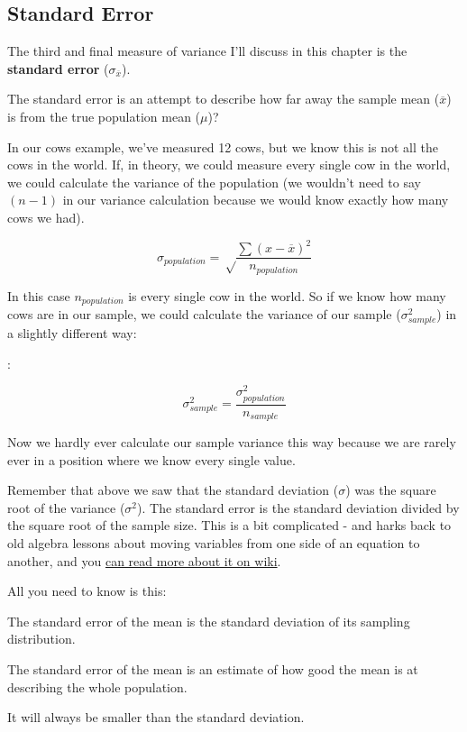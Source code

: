 \documentclass[
]{book}
\begin{document}
\hypertarget{stats_se}{%
\subsection{Standard Error}\label{stats_se}}

The third and final measure of variance I'll discuss in this chapter is the \textbf{standard error} (\(\sigma_\overline{x}\)).

The standard error is an attempt to describe how far away the sample mean (\(\overline{x}\)) is from the true population mean (\(\mu\))?

In our cows example, we've measured 12 cows, but we know this is not all the cows in the world. If, in theory, we could measure every single cow in the world, we could calculate the variance of the population (we wouldn't need to say \((n-1)\) in our variance calculation because we would know exactly how many cows we had).

\[\sigma_{population} = \sqrt \frac{\sum(x-\overline{x})^2}{n_{population}} \]

In this case \(n_{population}\) is every single cow in the world. So if we know how many cows are in our sample, we could calculate the variance of our sample (\(\sigma^2_{sample}\)) in a slightly different way:

:

\[\sigma^2_{sample} = \frac{\sigma^2_{population}}{n_{sample}}\]

Now we hardly ever calculate our sample variance this way because we are rarely ever in a position where we know every single value.

Remember that above we saw that the standard deviation (\(\sigma\)) was the square root of the variance (\(\sigma^2\)). The standard error is the standard deviation divided by the square root of the sample size. This is a bit complicated - and harks back to old algebra lessons about moving variables from one side of an equation to another, and you \href{https://en.wikipedia.org/wiki/Standard_error}{can read more about it on wiki}.

All you need to know is this:

\begin{hey}
The standard error of the mean is the standard deviation of its sampling
distribution.

The standard error of the mean is an estimate of how good the mean is at
describing the whole population.

It will always be smaller than the standard deviation.
\end{hey}
\end{document}
